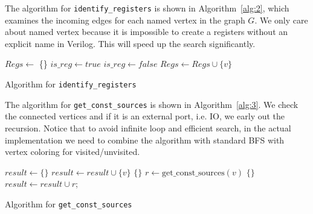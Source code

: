 \documentclass{article}
\begin{document}
The algorithm for \texttt{identify\_registers} is shown in Algorithm~\ref{alg:2}, which examines
the incoming edges for each named vertex in the graph $G$. We only care about named vertex because
it is impossible to create a registers without an explicit name in Verilog. This will speed up
the search significantly.
\begin{algorithm}[!tbh]
    \label{alg:2}
    $Regs \gets$ \{\}\;
     {
        $is\_reg \gets true$\;
         {
             {
                $is\_reg \gets false$\;
                \Break\;
            }
        }
         {
            $Regs \gets Regs \cup \{v\}$\;
        }
    }
    \;
 \caption{Algorithm for \texttt{identify\_registers}}
\end{algorithm}

The algorithm for \texttt{get\_const\_sources} is shown in Algorithm~\ref{alg:3}. We check the
connected vertices and if it is an external port, i.e. IO, we early out the recursion. Notice
that to avoid infinite loop and efficient search, in the actual implementation we need to
combine the algorithm with standard BFS with vertex coloring for visited/unvisited.
\begin{algorithm}[!tbh]
    \label{alg:3}
    $result \gets \{\}$\;
     {
         {
            $result \gets result \cup \{v\}$\;
        } {
             {
                \Return $\{\}$\;
            }
            $r \gets \text{get\_const\_sources}(v)$\;
             {
                \Return $\{\}$\;
            }
            $result \gets result \cup r$;
        }
    }
    \;
 \caption{Algorithm for \texttt{get\_const\_sources}}
\end{algorithm}
\end{document}
